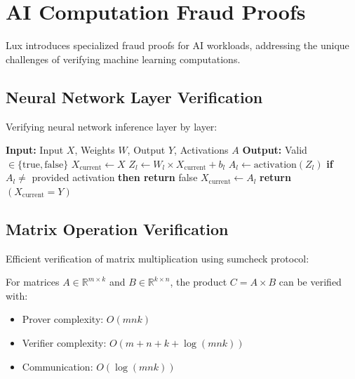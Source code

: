 \section{AI Computation Fraud Proofs}


Lux introduces specialized fraud proofs for AI workloads, addressing the unique challenges of verifying machine learning computations.

\subsection{Neural Network Layer Verification}

Verifying neural network inference layer by layer:

\begin{algorithm}
\caption{Layer-wise Neural Network Verification}
\begin{algorithmic}[1]
\State \textbf{Input:} Input $X$, Weights $W$, Output $Y$, Activations $A$
\State \textbf{Output:} Valid $\in \{\text{true}, \text{false}\}$
\State $X_{\text{current}} \gets X$
    \State $Z_l \gets W_l \times X_{\text{current}} + b_l$
    \State $A_l \gets \text{activation}(Z_l)$
    \State \textbf{if} $A_l \neq$ provided activation \textbf{then return} false
    \State $X_{\text{current}} \gets A_l$
\EndFor
\State \textbf{return} $(X_{\text{current}} = Y)$
\end{algorithmic}
\end{algorithm}

\subsection{Matrix Operation Verification}

Efficient verification of matrix multiplication using sumcheck protocol:

\begin{theorem}
For matrices $A \in \mathbb{R}^{m \times k}$ and $B \in \mathbb{R}^{k \times n}$, the product $C = A \times B$ can be verified with:
\begin{itemize}
    \item Prover complexity: $O(mnk)$
    \item Verifier complexity: $O(m + n + k + \log(mnk))$
    \item Communication: $O(\log(mnk))$
\end{itemize}
\end{theorem}

